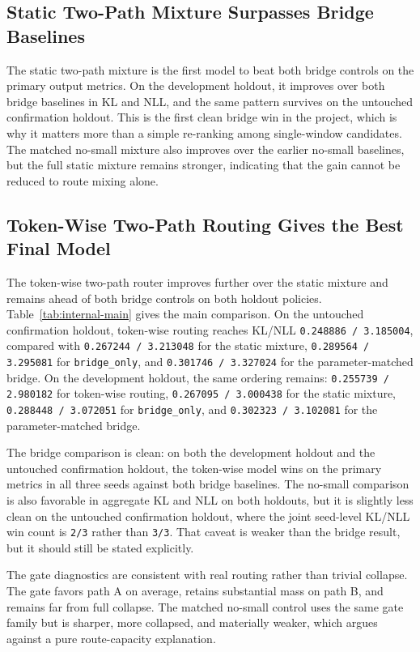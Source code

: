 \documentclass[11pt]{article}
\begin{document}
\subsection{Static Two-Path Mixture Surpasses Bridge Baselines}

The static two-path mixture is the first model to beat both bridge controls on the primary output metrics. On the development holdout, it improves over both bridge baselines in KL and NLL, and the same pattern survives on the untouched confirmation holdout. This is the first clean bridge win in the project, which is why it matters more than a simple re-ranking among single-window candidates. The matched no-small mixture also improves over the earlier no-small baselines, but the full static mixture remains stronger, indicating that the gain cannot be reduced to route mixing alone.

\subsection{Token-Wise Two-Path Routing Gives the Best Final Model}

The token-wise two-path router improves further over the static mixture and remains ahead of both bridge controls on both holdout policies. Table~\ref{tab:internal-main} gives the main comparison. On the untouched confirmation holdout, token-wise routing reaches KL/NLL \texttt{0.248886 / 3.185004}, compared with \texttt{0.267244 / 3.213048} for the static mixture, \texttt{0.289564 / 3.295081} for \texttt{bridge\_only}, and \texttt{0.301746 / 3.327024} for the parameter-matched bridge. On the development holdout, the same ordering remains: \texttt{0.255739 / 2.980182} for token-wise routing, \texttt{0.267095 / 3.000438} for the static mixture, \texttt{0.288448 / 3.072051} for \texttt{bridge\_only}, and \texttt{0.302323 / 3.102081} for the parameter-matched bridge.

The bridge comparison is clean: on both the development holdout and the untouched confirmation holdout, the token-wise model wins on the primary metrics in all three seeds against both bridge baselines. The no-small comparison is also favorable in aggregate KL and NLL on both holdouts, but it is slightly less clean on the untouched confirmation holdout, where the joint seed-level KL/NLL win count is \texttt{2/3} rather than \texttt{3/3}. That caveat is weaker than the bridge result, but it should still be stated explicitly.

The gate diagnostics are consistent with real routing rather than trivial collapse. The gate favors path A on average, retains substantial mass on path B, and remains far from full collapse. The matched no-small control uses the same gate family but is sharper, more collapsed, and materially weaker, which argues against a pure route-capacity explanation.
\end{document}
